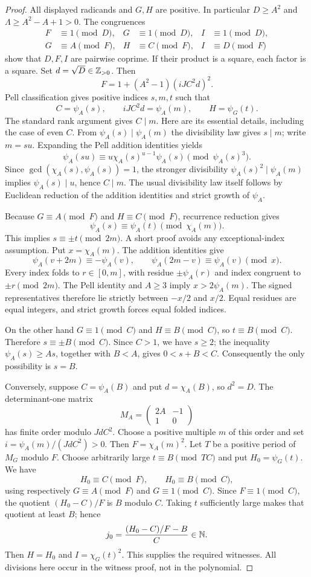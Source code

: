 \begin{proof}
All displayed radicands and $G,H$ are positive.  In particular
$D\ge A^2$ and $\Lambda\ge A^2-A+1>0$.  The congruences
\begin{align*}
 F&\equiv1\pmod D,&G&\equiv1\pmod D,&I&\equiv1\pmod D,\\
 G&\equiv A\pmod F,&H&\equiv C\pmod F,&I&\equiv D\pmod F
\end{align*}
show that $D,F,I$ are pairwise coprime.  If their product is a square,
each factor is a square.  Set $d=\sqrt D\in\mathbb Z_{>0}$.  Then
\[
 F=1+(A^2-1)(iJC^2d)^2.
\]
Pell classification gives positive indices $s,m,t$ such that
\[
 C=\psi_A(s),\qquad iJC^2d=\psi_A(m),\qquad H=\psi_G(t).
\]
The standard rank argument gives $C\mid m$.  Here are its essential
details, including the case of even $C$.  From
$\psi_A(s)\mid\psi_A(m)$ the divisibility law gives $s\mid m$; write
$m=su$.  Expanding the Pell addition identities yields
\[
 \psi_A(su)\equiv
 u\chi_A(s)^{u-1}\psi_A(s)\pmod{\psi_A(s)^3}.
\]
Since $\gcd(\chi_A(s),\psi_A(s))=1$, the stronger divisibility
$\psi_A(s)^2\mid\psi_A(m)$ implies $\psi_A(s)\mid u$, hence $C\mid m$.
The usual divisibility law itself follows by Euclidean reduction of the
addition identities and strict growth of $\psi_A$.

Because $G\equiv A\pmod F$ and $H\equiv C\pmod F$, recurrence reduction
gives
\[
 \psi_A(s)\equiv\psi_A(t)\pmod{\chi_A(m)}.
\]
This implies $s\equiv\pm t\pmod{2m}$.  A short proof avoids any
exceptional-index assumption.  Put $x=\chi_A(m)$.  The addition identities
give
\[
 \psi_A(v+2m)\equiv-\psi_A(v),\qquad
 \psi_A(2m-v)\equiv\psi_A(v)\pmod x.
\]
Every index folds to $r\in[0,m]$, with residue $\pm\psi_A(r)$ and index
congruent to $\pm r\pmod{2m}$.  The Pell identity and $A\ge3$ imply
$x>2\psi_A(m)$.  The signed representatives therefore lie strictly between
$-x/2$ and $x/2$.  Equal residues are equal integers, and strict growth
forces equal folded indices.

On the other hand $G\equiv1\pmod C$ and $H\equiv B\pmod C$, so
$t\equiv B\pmod C$.  Therefore $s\equiv\pm B\pmod C$.  Since $C>1$,
we have $s\ge2$; the inequality $\psi_A(s)\ge As$, together with $B<A$,
gives $0<s+B<C$.  Consequently the only possibility is $s=B$.

Conversely, suppose $C=\psi_A(B)$ and put $d=\chi_A(B)$, so $d^2=D$.
The determinant-one matrix
\[
 M_A=\begin{pmatrix}2A&-1\\1&0\end{pmatrix}
\]
has finite order modulo $JdC^2$.  Choose a positive multiple $m$ of this
order and set $i=\psi_A(m)/(JdC^2)>0$.  Then $F=\chi_A(m)^2$.
Let $T$ be a positive period of $M_G$ modulo $F$.  Choose arbitrarily large
$t\equiv B\pmod{TC}$ and put $H_0=\psi_G(t)$.  We have
\[
 H_0\equiv C\pmod F,\qquad H_0\equiv B\pmod C,
\]
using respectively $G\equiv A\pmod F$ and $G\equiv1\pmod C$.
Since $F\equiv1\pmod C$, the quotient $(H_0-C)/F$ is $B$ modulo $C$.
Taking $t$ sufficiently large makes that quotient at least $B$; hence
\[
 j_0=\frac{(H_0-C)/F-B}{C}\in\mathbb N.
\]
Then $H=H_0$ and $I=\chi_G(t)^2$.  This supplies the required witnesses.
All divisions here occur in the witness proof, not in the polynomial.
\end{proof}

